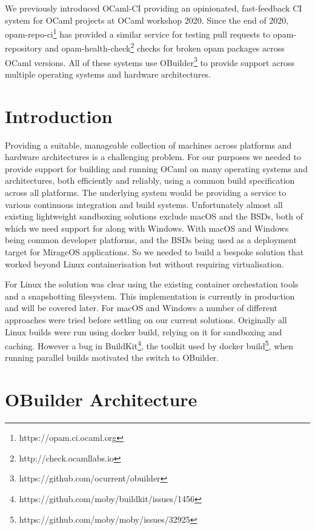 \documentclass[manuscript,screen,sigplan]{acmart}
\begin{document}
We previously introduced OCaml-CI \cite{ocamlci:2020} providing an opinionated, fast-feedback CI system for OCaml projects at OCaml workshop 2020. Since the end of 2020, opam-repo-ci\footnote{https://opam.ci.ocaml.org} has provided a similar service for testing pull requests to opam-repository and opam-health-check\footnote{http://check.ocamllabs.io} checks for broken opam packages across OCaml versions. All of these systems use OBuilder\footnote{https://github.com/ocurrent/obuilder} to provide support across multiple operating systems and hardware architectures.

\section{Introduction}

Providing a suitable, manageable collection of machines across platforms and hardware architectures is a challenging problem. For our purposes we needed to provide support for building and running OCaml on many operating systems and architectures, both efficiently and reliably, using a common build specification across all platforms. The underlying system would be providing a service to various continuous integration and build systems. Unfortunately almost all existing lightweight sandboxing solutions exclude macOS and the BSDs, both of which we need support for along with Windows. With macOS and Windows being common developer platforms, and the BSDs being used as a deployment target for MirageOS applications. So we needed to build a bespoke solution that worked beyond Linux containerisation but without requiring virtualisation. 

For Linux the solution was clear using the existing container orchestation tools and a snapshotting filesystem. This implementation is currently in production and will be covered later. For macOS and Windows a number of different approaches were tried before settling on our current solutions. Originally all Linux builds were run using docker build, relying on it for sandboxing and caching. However a bug in BuildKit\footnote{https://github.com/moby/buildkit/issues/1456}, the toolkit used by docker build\footnote{https://github.com/moby/moby/issues/32925}, when running parallel builds motivated the switch to OBuilder. 

\section{OBuilder Architecture}
\end{document}
